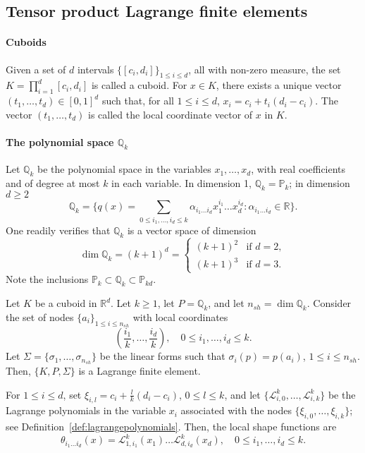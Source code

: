 \subsection{Tensor product Lagrange finite elements}
\paragraph{Cuboids}
Given a set of $d$ intervals $\{[c_i, d_i]\}_{1 \le i \le d}$, all with non-zero measure, the set $K = \prod_{i=1}^d [c_i, d_i]$ is called a cuboid. For $x \in K$, there exists a unique vector $(t_1, \dots, t_d) \in [0, 1]^d$ such that, for all $1 \le i \le d$, $x_i = c_i + t_i(d_i - c_i)$. The vector $(t_1, \dots, t_d)$ is called the local coordinate vector of $x$ in $K$.

\paragraph{The polynomial space $\mathbb{Q}_k$} Let $\mathbb{Q}_k$ be the polynomial space in the variables $x_1, \dots, x_d$, with real coefficients and of degree at most $k$ in each variable. In dimension 1, $\mathbb{Q}_k = \mathbb{P}_k$; in dimension $d \ge 2$
\begin{equation*}
\mathbb{Q}_k = \{ q(x) = \sum_{0 \le i_1, \dots, i_d \le k} \alpha_{i_1 \dots i_d} x_1^{i_1} \dots x_d^{i_d} : \alpha_{i_1 \dots i_d} \in \mathbb{R} \}.
\end{equation*}
One readily verifies that $\mathbb{Q}_k$ is a vector space of dimension
\begin{equation*}
\dim \mathbb{Q}_k = (k+1)^d = \begin{cases} (k+1)^2 & \text{if } d=2, \\ (k+1)^3 & \text{if } d=3. \end{cases}
\end{equation*}
Note the inclusions $\mathbb{P}_k \subset \mathbb{Q}_k \subset \mathbb{P}_{kd}$.

\begin{lemma}\label{lemma:tensor_product_lagrange_fe}
    Let $K$ be a cuboid in $\mathbb{R}^d$. Let $k \ge 1$, let $P = \mathbb{Q}_k$, and let $n_{sh} = \dim \mathbb{Q}_k$. Consider the set of nodes $\{a_i\}_{1 \le i \le n_{sh}}$ with local coordinates
    \begin{equation*}
\left(\frac{i_1}{k}, \dots, \frac{i_d}{k}\right), \quad 0 \le i_1, \dots, i_d \le k.
\end{equation*}
    Let $\Sigma = \{\sigma_1, \dots, \sigma_{n_{sh}}\}$ be the linear forms such that $\sigma_i(p) = p(a_i)$, $1 \le i \le n_{sh}$. Then, $\{K, P, \Sigma\}$ is a Lagrange finite element.
\end{lemma}
For $1 \le i \le d$, set $\xi_{i,l} = c_i + \frac{l}{k}(d_i - c_i)$, $0 \le l \le k$, and let $\{\mathcal{L}_{i,0}^k, \dots, \mathcal{L}_{i,k}^k\}$ be the Lagrange polynomials in the variable $x_i$ associated with the nodes $\{\xi_{i,0}, \dots, \xi_{i,k}\}$; see Definition~\ref{def:lagrangepolynomials}. Then, the local shape functions are
\begin{equation*}
\theta_{i_1 \dots i_d}(x) = \mathcal{L}_{1,i_1}^k(x_1) \dots \mathcal{L}_{d,i_d}^k(x_d), \quad 0 \le i_1, \dots, i_d \le k.
\end{equation*}
